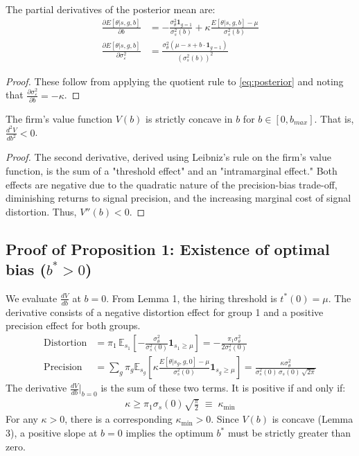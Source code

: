 \begin{lemma}
The partial derivatives of the posterior mean are:
\begin{align}
\frac{\partial E[\theta | s, g, b]}{\partial b} &= -\frac{\sigma_\theta^2 \mathbf{1}_{g=1}}{\sigma_s^2(b)} + \kappa \frac{E[\theta|s,g,b] - \mu}{\sigma_s^2(b)} \\
\frac{\partial E[\theta | s, g, b]}{\partial \sigma_\varepsilon^2} &= \frac{\sigma_\theta^2(\mu - s + b \cdot \mathbf{1}_{g=1})}{(\sigma_s^2(b))^2}
\end{align}
\end{lemma}
\begin{proof}
These follow from applying the quotient rule to \eqref{eq:posterior} and noting that $\frac{\partial \sigma_\varepsilon^2}{\partial b} = -\kappa$.
\end{proof}

\begin{lemma}
The firm's value function $V(b)$ is strictly concave in $b$ for $b \in [0, b_{max}]$. That is, $\frac{d^2V}{db^2} < 0$.
\end{lemma}
\begin{proof}
The second derivative, derived using Leibniz's rule on the firm's value function, is the sum of a "threshold effect" and an "intramarginal effect." Both effects are negative due to the quadratic nature of the precision-bias trade-off, diminishing returns to signal precision, and the increasing marginal cost of signal distortion. Thus, $V''(b) < 0$.
\end{proof}
    

\clearpage
\setlength{\parindent}{0pt} 
\subsection{Proof of Proposition 1: Existence of optimal bias ($b^* > 0$)}
We evaluate $\frac{dV}{db}$ at $b=0$. From Lemma 1, the hiring threshold is $t^*(0)=\mu$. The derivative consists of a negative distortion effect for group 1 and a positive precision effect for both groups.
\begin{align}
\text{Distortion} &= \pi_1 \, \mathbb{E}_{s_1}\left[-\frac{\sigma_\theta^2}{\sigma_s^2(0)} \mathbf{1}_{s_1 \ge \mu}\right] = -\frac{\pi_1 \sigma_\theta^2}{2\sigma_s^2(0)} \\
\text{Precision} &= \sum_g \pi_g \mathbb{E}_{s_g}\left[ \kappa \frac{E[\theta|s_g,g,0]-\mu}{\sigma_s^2(0)} \mathbf{1}_{s_g \ge \mu} \right] = \frac{\kappa \sigma_\theta^2}{\sigma_s^2(0)\,\sigma_s(0)\,\sqrt{2\pi}}
\end{align}
The derivative $\frac{dV}{db}\Big|_{b=0}$ is the sum of these two terms. It is positive if and only if:
\begin{align}
\kappa \geq \pi_1 \sigma_s(0) \sqrt{\tfrac{\pi}{2}} \;\equiv\; \kappa_{\min}
\end{align}
For any $\kappa > 0$, there is a corresponding $\kappa_{\min}>0$. Since $V(b)$ is concave (Lemma 3), a positive slope at $b=0$ implies the optimum $b^*$ must be strictly greater than zero.

